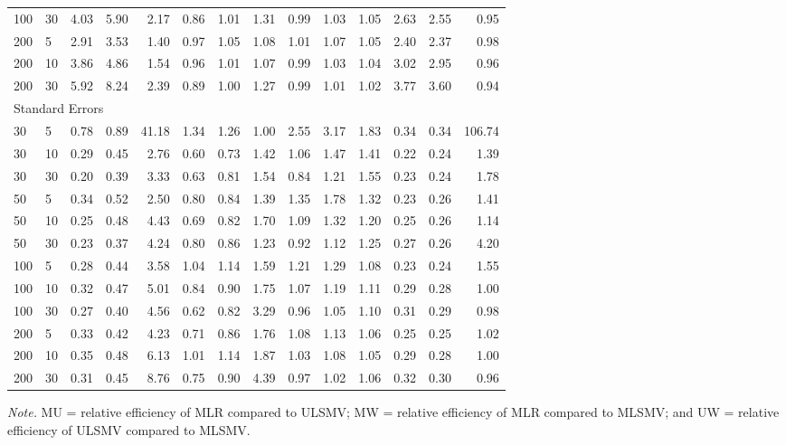 \documentclass[Review,sageh,times, doublespace]{sagej}
\begin{document}
\begin{table}[!htp]
\begin{threeparttable}
\begin{tabular}{llrrrrrrrrrrrr}
  100 & 30 & 4.03 & 5.90 & 2.17 & 0.86 & 1.01 & 1.31 & 0.99 & 1.03 & 1.05 & 2.63 & 2.55 & 0.95 \\ 
  200 & 5 & 2.91 & 3.53 & 1.40 & 0.97 & 1.05 & 1.08 & 1.01 & 1.07 & 1.05 & 2.40 & 2.37 & 0.98 \\ 
  200 & 10 & 3.86 & 4.86 & 1.54 & 0.96 & 1.01 & 1.07 & 0.99 & 1.03 & 1.04 & 3.02 & 2.95 & 0.96 \\ 
  200 & 30 & 5.92 & 8.24 & 2.39 & 0.89 & 1.00 & 1.27 & 0.99 & 1.01 & 1.02 & 3.77 & 3.60 & 0.94 \\ 
\multicolumn{14}{l}{Standard Errors}\\
30 & 5 & 0.78 & 0.89 & 41.18 & 1.34 & 1.26 & 1.00 & 2.55 & 3.17 & 1.83 & 0.34 & 0.34 & 106.74 \\ 
  30 & 10 & 0.29 & 0.45 & 2.76 & 0.60 & 0.73 & 1.42 & 1.06 & 1.47 & 1.41 & 0.22 & 0.24 & 1.39 \\ 
  30 & 30 & 0.20 & 0.39 & 3.33 & 0.63 & 0.81 & 1.54 & 0.84 & 1.21 & 1.55 & 0.23 & 0.24 & 1.78 \\ 
  50 & 5 & 0.34 & 0.52 & 2.50 & 0.80 & 0.84 & 1.39 & 1.35 & 1.78 & 1.32 & 0.23 & 0.26 & 1.41 \\ 
  50 & 10 & 0.25 & 0.48 & 4.43 & 0.69 & 0.82 & 1.70 & 1.09 & 1.32 & 1.20 & 0.25 & 0.26 & 1.14 \\ 
  50 & 30 & 0.23 & 0.37 & 4.24 & 0.80 & 0.86 & 1.23 & 0.92 & 1.12 & 1.25 & 0.27 & 0.26 & 4.20 \\ 
  100 & 5 & 0.28 & 0.44 & 3.58 & 1.04 & 1.14 & 1.59 & 1.21 & 1.29 & 1.08 & 0.23 & 0.24 & 1.55 \\ 
  100 & 10 & 0.32 & 0.47 & 5.01 & 0.84 & 0.90 & 1.75 & 1.07 & 1.19 & 1.11 & 0.29 & 0.28 & 1.00 \\ 
  100 & 30 & 0.27 & 0.40 & 4.56 & 0.62 & 0.82 & 3.29 & 0.96 & 1.05 & 1.10 & 0.31 & 0.29 & 0.98 \\ 
  200 & 5 & 0.33 & 0.42 & 4.23 & 0.71 & 0.86 & 1.76 & 1.08 & 1.13 & 1.06 & 0.25 & 0.25 & 1.02 \\ 
  200 & 10 & 0.35 & 0.48 & 6.13 & 1.01 & 1.14 & 1.87 & 1.03 & 1.08 & 1.05 & 0.29 & 0.28 & 1.00 \\ 
  200 & 30 & 0.31 & 0.45 & 8.76 & 0.75 & 0.90 & 4.39 & 0.97 & 1.02 & 1.06 & 0.32 & 0.30 & 0.96 \\ 
   \bottomrule
\end{tabular}
 \vspace*{1mm}
 	\begin{tablenotes}
    {\small
        \textit{Note.} MU = relative efficiency of MLR compared to ULSMV; MW = relative efficiency of MLR compared to MLSMV; and UW = relative efficiency of ULSMV compared to MLSMV.
    }
 	\end{tablenotes}
 \end{threeparttable}
\end{table}
\end{document}
